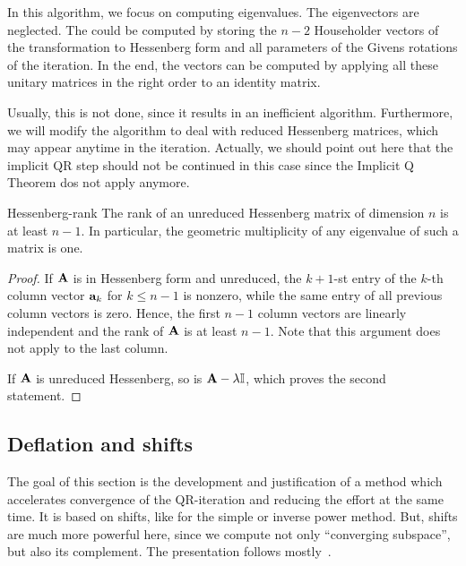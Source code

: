 \begin{remark}
  In this algorithm, we focus on computing eigenvalues. The
  eigenvectors are neglected. The could be computed by storing the
  $n-2$ Householder vectors of the transformation to Hessenberg form
  and all parameters of the Givens rotations of the iteration. In the
  end, the vectors can be computed by applying all these unitary
  matrices in the right order to an identity matrix.

  Usually, this is not done, since it results in an inefficient
  algorithm. Furthermore, we will modify the algorithm to deal with
  reduced Hessenberg matrices, which may appear anytime in the
  iteration. Actually, we should point out here that the implicit QR
  step should not be continued in this case since the Implicit Q
  Theorem dos not apply anymore.
\end{remark}

\begin{Lemma}{Hessenberg-rank}
  The rank of an unreduced Hessenberg matrix of dimension $n$ is at
  least $n-1$. In particular, the geometric multiplicity of any
  eigenvalue of such a matrix is one.
\end{Lemma}

\begin{proof}
  If $\mathbf A$ is in Hessenberg form and unreduced, the $k+1$-st entry
  of the $k$-th column vector $\mathbf a_k$ for $k\le n-1$ is nonzero, while
  the same entry of all previous column vectors is zero. Hence, the
  first $n-1$ column vectors are linearly independent and the rank of
  $\mathbf A$ is at least $n-1$. Note that this argument does not apply to
  the last column.

  If $\mathbf A$ is unreduced Hessenberg, so is $\mathbf A-\lambda\mathbb I$, which
  proves the second statement.
\end{proof}

\subsection{Deflation and shifts}

\begin{intro}
  The goal of this section is the development and justification of a
  method which accelerates convergence of the QR-iteration and
  reducing the effort at the same time. It is based on shifts, like
  for the simple or inverse power method. But, shifts are much more
  powerful here, since we compute not only ``converging subspace'',
  but also its complement. The presentation follows
  mostly~\cite{GolubVanLoan83}.
\end{intro}

